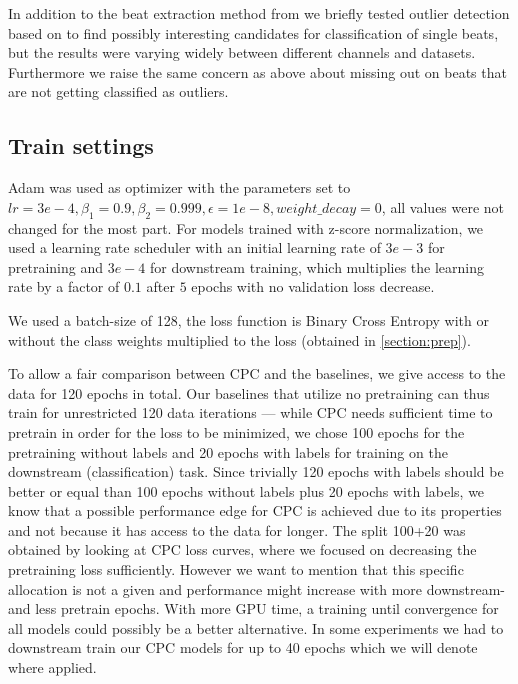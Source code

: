 In addition to the beat extraction method from \autocite{beat_classification} we briefly tested outlier detection based on \autocite{Harmeling_Dornhege_Tax_Meinecke_Müller_2006} to find possibly interesting candidates for classification of single beats, but the results were varying widely between different channels and datasets. Furthermore we raise the same concern as above about missing out on beats that are not getting classified as outliers.

\subsection{Train settings}
Adam was used as optimizer with the parameters set to $lr=3e-4, \beta_1= 0.9, \beta_2=0.999, \epsilon=1e-8, weight\_decay=0$, all values were not changed for the most part. For models trained with z-score normalization, we used a learning rate scheduler with an initial learning rate of $3e-3$ for pretraining and $3e-4$ for downstream training, which multiplies the learning rate by a factor of $0.1$ after $5$ epochs with no validation loss decrease.

We used a batch-size of 128, the loss function is Binary Cross Entropy with or without the class weights multiplied to the loss (obtained in \autoref{section:prep}).

To allow a fair comparison between CPC and the baselines, we give access to the data for 120 epochs in total. Our baselines that utilize no pretraining can thus train for unrestricted 120 data iterations --- while CPC needs sufficient time to pretrain in order for the loss to be minimized, we chose 100 epochs for the pretraining without labels and 20 epochs with labels for training on the downstream (classification) task. Since trivially 120 epochs with labels should be better or equal than 100 epochs without labels plus 20 epochs with labels, we know that a possible performance edge for CPC is achieved due to its properties and not because it has access to the data for longer. The split 100+20 was obtained by looking at CPC loss curves, where we focused on decreasing the pretraining loss sufficiently. However we want to mention that this specific allocation is not a given and performance might increase with more downstream- and less pretrain epochs. With more GPU time, a training until convergence for all models could possibly be a better alternative. In some experiments we had to downstream train our CPC models for up to 40 epochs which we will denote where applied.

